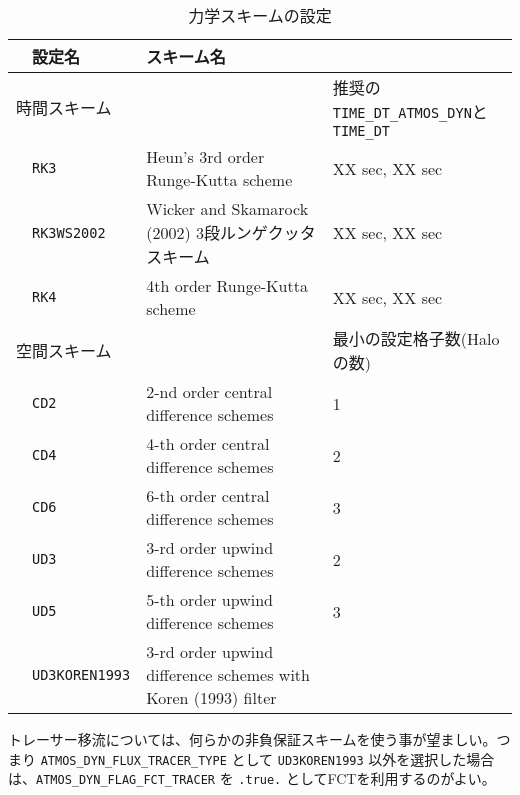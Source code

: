 \begin{table}[h]
\begin{center}
  \caption{力学スキームの設定}
  \label{tab:nml_atm_dyn}
  \begin{tabularx}{150mm}{llXX} \hline
    \rowcolor[gray]{0.9} & \multicolumn{1}{l}{設定名} & \multicolumn{1}{l}{スキーム名} & \\ \hline
    \multicolumn{3}{l}{時間スキーム} & 推奨の\verb|TIME_DT_ATMOS_DYN|と\verb|TIME_DT| \\ \hline
    & \multicolumn{1}{l}{\verb|RK3|} & \multicolumn{1}{l}{Heun's 3rd order Runge-Kutta scheme} & \multicolumn{1}{l}{XX sec, XX sec}\\
    & \multicolumn{1}{l}{\verb|RK3WS2002|} & \multicolumn{1}{X}{Wicker and Skamarock (2002) 3段ルンゲクッタスキーム} & \multicolumn{1}{l}{XX sec, XX sec}\\
    & \multicolumn{1}{l}{\verb|RK4|} & \multicolumn{1}{l}{4th order Runge-Kutta scheme} & \multicolumn{1}{l}{XX sec, XX sec}\\
    \hline
    \multicolumn{3}{l}{空間スキーム} & 最小の設定格子数(Haloの数)\\ \hline
    & \multicolumn{1}{l}{\verb|CD2|} & \multicolumn{1}{l}{2-nd order central difference schemes} & \multicolumn{1}{l}{1}\\
    & \multicolumn{1}{l}{\verb|CD4|} & \multicolumn{1}{l}{4-th order central difference schemes} & \multicolumn{1}{l}{2}\\
    & \multicolumn{1}{l}{\verb|CD6|} & \multicolumn{1}{l}{6-th order central difference schemes} & \multicolumn{1}{l}{3}\\
    & \multicolumn{1}{l}{\verb|UD3|} & \multicolumn{1}{l}{3-rd order upwind difference schemes} & \multicolumn{1}{l}{2}\\
    & \multicolumn{1}{l}{\verb|UD5|} & \multicolumn{1}{l}{5-th order upwind difference schemes} & \multicolumn{1}{l}{3}\\
    & \multicolumn{1}{l}{\verb|UD3KOREN1993|} & \multicolumn{1}{X}{3-rd order upwind difference schemes with Koren (1993) filter} & \\
\hline
  \end{tabularx}
\end{center}
\end{table}

トレーサー移流については、何らかの非負保証スキームを使う事が望ましい。つまり \verb|ATMOS_DYN_FLUX_TRACER_TYPE| として \verb|UD3KOREN1993| 以外を選択した場合は、\verb|ATMOS_DYN_FLAG_FCT_TRACER| を \verb|.true.| としてFCTを利用するのがよい。


